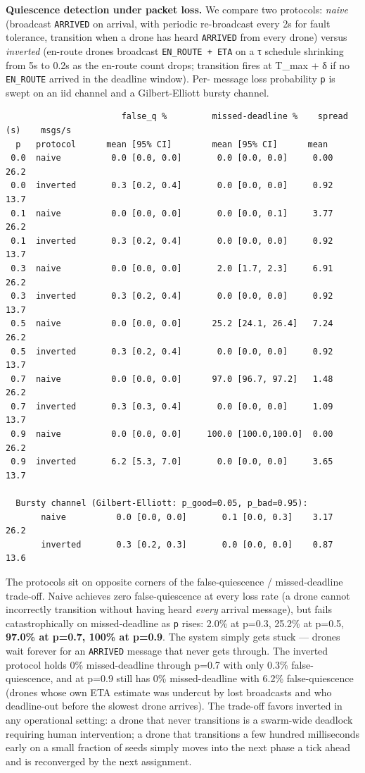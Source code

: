 \textbf{Quiescence detection under packet loss.} We compare two
protocols: \emph{naive} (broadcast \texttt{ARRIVED} on arrival, with
periodic re-broadcast every 2s for fault tolerance, transition when a
drone has heard \texttt{ARRIVED} from every drone) versus
\emph{inverted} (en-route drones broadcast \texttt{EN\_ROUTE\ +\ ETA} on
a τ schedule shrinking from 5s to 0.2s as the en-route count drops;
transition fires at T\_max + δ if no \texttt{EN\_ROUTE} arrived in the
deadline window). Per- message loss probability \texttt{p} is swept on
an iid channel and a Gilbert-Elliott bursty channel.

\begin{verbatim}
                       false_q %         missed-deadline %    spread (s)    msgs/s
  p   protocol      mean [95% CI]        mean [95% CI]      mean
 0.0  naive          0.0 [0.0, 0.0]       0.0 [0.0, 0.0]     0.00            26.2
 0.0  inverted       0.3 [0.2, 0.4]       0.0 [0.0, 0.0]     0.92            13.7
 0.1  naive          0.0 [0.0, 0.0]       0.0 [0.0, 0.1]     3.77            26.2
 0.1  inverted       0.3 [0.2, 0.4]       0.0 [0.0, 0.0]     0.92            13.7
 0.3  naive          0.0 [0.0, 0.0]       2.0 [1.7, 2.3]     6.91            26.2
 0.3  inverted       0.3 [0.2, 0.4]       0.0 [0.0, 0.0]     0.92            13.7
 0.5  naive          0.0 [0.0, 0.0]      25.2 [24.1, 26.4]   7.24            26.2
 0.5  inverted       0.3 [0.2, 0.4]       0.0 [0.0, 0.0]     0.92            13.7
 0.7  naive          0.0 [0.0, 0.0]      97.0 [96.7, 97.2]   1.48            26.2
 0.7  inverted       0.3 [0.3, 0.4]       0.0 [0.0, 0.0]     1.09            13.7
 0.9  naive          0.0 [0.0, 0.0]     100.0 [100.0,100.0]  0.00            26.2
 0.9  inverted       6.2 [5.3, 7.0]       0.0 [0.0, 0.0]     3.65            13.7

  Bursty channel (Gilbert-Elliott: p_good=0.05, p_bad=0.95):
       naive          0.0 [0.0, 0.0]       0.1 [0.0, 0.3]    3.17            26.2
       inverted       0.3 [0.2, 0.3]       0.0 [0.0, 0.0]    0.87            13.6
\end{verbatim}

The protocols sit on opposite corners of the false-quiescence /
missed-deadline trade-off. Naive achieves zero false-quiescence at every
loss rate (a drone cannot incorrectly transition without having heard
\emph{every} arrival message), but fails catastrophically on
missed-deadline as \texttt{p} rises: 2.0\% at p=0.3, 25.2\% at p=0.5,
\textbf{97.0\% at p=0.7, 100\% at p=0.9}. The system simply gets stuck
--- drones wait forever for an \texttt{ARRIVED} message that never gets
through. The inverted protocol holds 0\% missed-deadline through p=0.7
with only 0.3\% false-quiescence, and at p=0.9 still has 0\%
missed-deadline with 6.2\% false-quiescence (drones whose own ETA
estimate was undercut by lost broadcasts and who deadline-out before the
slowest drone arrives). The trade-off favors inverted in any operational
setting: a drone that never transitions is a swarm-wide deadlock
requiring human intervention; a drone that transitions a few hundred
milliseconds early on a small fraction of seeds simply moves into the
next phase a tick ahead and is reconverged by the next assignment.


